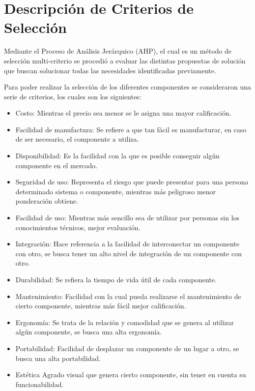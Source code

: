 \section{Descripción de Criterios de Selección}\label{Ap:Crit}

Mediante el Proceso de Análisis Jerárquico (AHP), el cual es un método de selección multi-criterio se procedió a evaluar las distintas propuestas de solución que buscan solucionar todas las necesidades identificadas previamente.

Para poder realizar la selección de los diferentes componentes se consideraron una serie de criterios, los cuales son los siguientes:

\begin{itemize}
    \item Costo:
    Mientras el precio sea menor se le asigna una mayor calificación.
    \item Facilidad de manufactura:
    Se refiere a que tan fácil es manufacturar, en caso de ser necesario, el componente a utiliza.
    \item Disponibilidad:
    Es la facilidad con la que es posible conseguir algún componente en el mercado.
    \item Seguridad de uso:
    Representa el riesgo que puede presentar para una persona determinado sistema o componente, mientras más peligroso menor ponderación obtiene.
    \item Facilidad de uso:
    Mientras más sencillo sea de utilizar por personas sin los conocimientos técnicos, mejor evaluación.
    \item Integración:
    Hace referencia a la facilidad de interconectar un componente con otro, se busca tener un alto nivel de integración de un componente con otro.
    \item Durabilidad:
    Se refiera la tiempo de vida útil de cada componente.
    \item Mantenimiento:
    Facilidad con la cual pueda realizarse el mantenimiento de cierto componente, mientras más fácil mejor calificación.
    \item Ergonomía:
    Se trata de la relación y comodidad que se genera al utilizar algún componente, se busca una alta ergonomía.
    \item Portabilidad:
    Facilidad de desplazar un componente de un lugar a otro, se busca una alta portabilidad.
    \item Estética
    Agrado visual que genera cierto componente, sin tener en cuenta su funcionabilidad.
\end{itemize}

